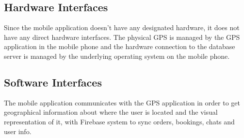 \documentclass{scrreprt}
\begin{document}
\begin{figure}[h]
\begin{minipage}[h]{0.32\linewidth}
	\end{minipage}
\end{figure}

\newpage
\subsection{Hardware Interfaces}
Since the mobile application doesn't have any designated hardware, it does not have
any direct hardware interfaces. The physical GPS is managed by the GPS application in the mobile phone
and the hardware connection to the database server is managed by the underlying operating system on the
mobile phone.

\subsection{Software Interfaces}
The mobile application communicates with the GPS application in order to get geographical information
about where the user is located and the visual representation of it, with Firebase system to sync orders, bookings, chats and user info.
\end{document}
